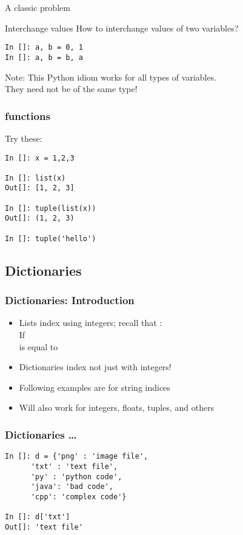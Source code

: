 \documentclass[14pt,compress]{beamer}
\begin{document}
\begin{frame}[fragile]
  {A classic problem}
  \begin{block}
    {Interchange values}
    How to interchange values of two variables?
  \end{block}
  \pause
\begin{lstlisting}
In []: a, b = 0, 1
In []: a, b = b, a
\end{lstlisting}
  \begin{block}{Note:}
    This Python idiom works for all types of variables.\\
They need not be of the same type!
  \end{block}
\end{frame}

\begin{frame}[fragile]
  \frametitle{ functions}
  Try these:
\begin{lstlisting}
In []: x = 1,2,3

In []: list(x)
Out[]: [1, 2, 3]

In []: tuple(list(x))
Out[]: (1, 2, 3)

In []: tuple('hello')
\end{lstlisting}
\end{frame}

\subsection{Dictionaries}

\begin{frame}[fragile]
  \frametitle{Dictionaries: Introduction}
  \begin{itemize}
  \item Lists index using integers; recall that :\\
    \vspace*{1em}
      If \\
       is equal to 
      \vspace*{2em}
    \item Dictionaries index not just with integers!
    \item Following examples are for string indices
    \item Will also work for integers, floats, tuples, and others
  \end{itemize}
\end{frame}

\begin{frame}[fragile]
  \frametitle{Dictionaries \ldots}
  \begin{lstlisting}
In []: d = {'png' : 'image file',
      'txt' : 'text file',
      'py' : 'python code',
      'java': 'bad code',
      'cpp': 'complex code'}

In []: d['txt']
Out[]: 'text file'
  \end{lstlisting}
\end{frame}
\end{document}
